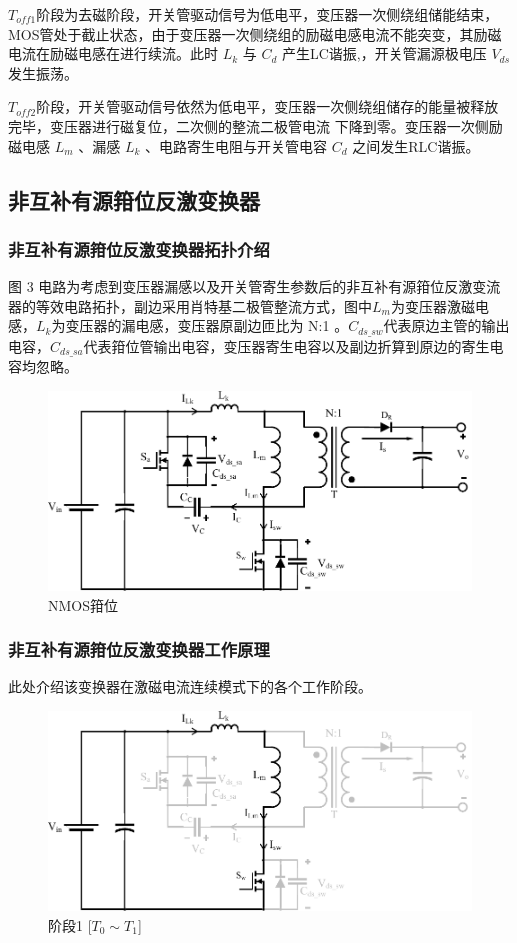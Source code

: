 \documentclass[UTF8]{ctexart}
\numberwithin{equation}{section}
\begin{document}
	$T_{off1}$阶段为去磁阶段，开关管驱动信号为低电平，变压器一次侧绕组储能结束，MOS管处于截止状态，由于变压器一次侧绕组的励磁电感电流不能突变，其励磁电流在励磁电感在进行续流。此时 $L_k$ 与 $C_d$ 产生LC谐振,，开关管漏源极电压 $V_{ds}$ 发生振荡。
	
	$T_{off2}$阶段，开关管驱动信号依然为低电平，变压器一次侧绕组储存的能量被释放完毕，变压器进行磁复位，二次侧的整流二极管电流  下降到零。变压器一次侧励磁电感 $L_m$ 、漏感 $L_k$ 、电路寄生电阻与开关管电容 $C_d$ 之间发生RLC谐振。
	
	
	\subsection{非互补有源箝位反激变换器}
	\subsubsection{非互补有源箝位反激变换器拓扑介绍}	
	图 3 电路为考虑到变压器漏感以及开关管寄生参数后的非互补有源箝位反激变流器的等效电路拓扑，副边采用肖特基二极管整流方式，图中$L_m$为变压器激磁电感，$L_k$为变压器的漏电感，变压器原副边匝比为 N:1 。$C_{ds\_sw}$代表原边主管的输出电容，$C_{ds\_sa}$代表箝位管输出电容，变压器寄生电容以及副边折算到原边的寄生电容均忽略。
	
	\begin{figure}[h]
		\centering
		\includegraphics[scale=0.75]{image/NMOS_Clamp.pdf}
		\caption{NMOS箝位}
	\end{figure}

	\subsubsection{非互补有源箝位反激变换器工作原理}
	此处介绍该变换器在激磁电流连续模式下的各个工作阶段。
	
	\begin{figure}[h]
		\centering
		\includegraphics[scale=0.5]{image/mo1.pdf}
		\caption{阶段1 [$T_0 \sim T_1$]}
	\end{figure}
	
\end{document}
